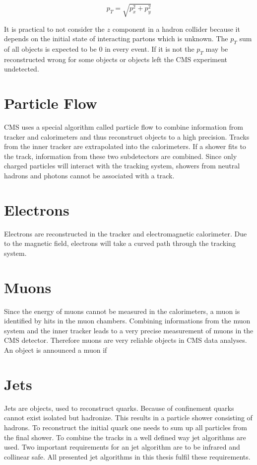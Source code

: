 	\begin{equation}
	p_T = \sqrt{p_x^2 + p_y^2}
	\end{equation} 

	\noindent It is practical to not consider the $z$ component in a hadron collider because it depends on the initial state of interacting partons which is unknown. The $p_T$ sum of all objects is expected to be $0$ in every event. If it is not the $p_T$ may be reconstructed wrong for some objects or objects left the CMS experiment undetected.
\section{Particle Flow}
	CMS uses a special algorithm called particle flow \cite{particleflow} to combine information from tracker and calorimeters and thus reconstruct objects to a high precision. Tracks from the inner tracker are extrapolated into the calorimeters. If a shower fits to the track, information from these two subdetectors are combined. Since only charged particles will interact with the tracking system, showers from neutral hadrons and photons cannot be associated with a track.
\section{Electrons}
	Electrons are reconstructed in the tracker and electromagnetic calorimeter. Due to the magnetic field, electrons will take a curved path through the tracking system.
\section{Muons}
	Since the energy of muons cannot be measured in the calorimeters, a muon is identified by hits in the muon chambers. Combining informations from the muon system and the inner tracker leads to a very precise measurement of muons in the CMS detector. Therefore muons are very reliable objects in CMS data analyses. An object is announced a muon if %
\section{Jets}
	Jets are objects, used to reconstruct quarks. Because of confinement quarks cannot exist isolated but hadronize. This results in a particle shower consisting of hadrons. To reconstruct the initial quark one needs to sum up all particles from the final shower. To combine the tracks in a well defined way jet algorithms are used. Two important requirements for an jet algorithm are to be infrared and collinear safe. 
	All presented jet algorithms in this thesis fulfil these requirements.
